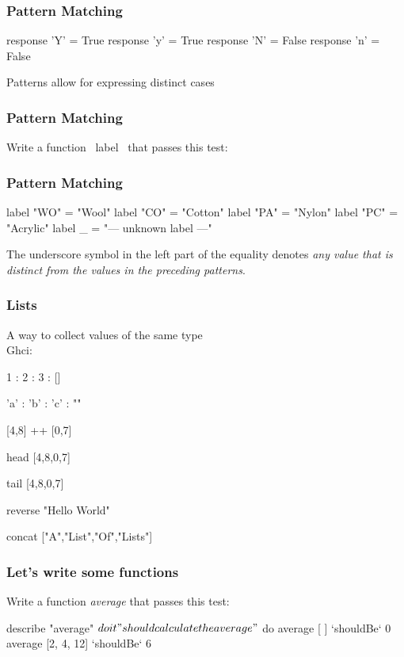\documentclass[11pt,xcolor={dvipsnames}]{beamer}
\newcommand{\tc}{\textcolor}
\newcommand{\key}[1]{\tc{orange}{#1}}
\newcommand{\rk}{\enskip{\key{$\hookleftarrow$}}}
\newcommand{\vs}{\vspace{1em}}
\begin{document}
\begin{frame}[fragile]
\frametitle{Pattern Matching}
\begin{haskell}
response 'Y' = True
response 'y' = True
response 'N' = False
response 'n' = False
\end{haskell}
\vs
Patterns allow for expressing distinct cases 
\end{frame}
\begin{frame}[fragile]
\frametitle{Pattern Matching}
Write a function ~label~ that passes this test:
\end{frame}
\begin{frame}[fragile]
\frametitle{Pattern Matching}
\begin{haskell}
label "WO" = "Wool"
label "CO" = "Cotton"
label "PA" = "Nylon"
label "PC" = "Acrylic"
label   _  = "--- unknown label ---"
\end{haskell}
The underscore symbol in the left part of the equality denotes \emph{any value that is distinct from the values in the preceding patterns}.
\end{frame}
\begin{frame}[fragile]
\frametitle{Lists}
A way to collect values of the same type\\
Ghci:
\begin{term}
1 : 2 : 3 : []\rk

'a' : 'b' : 'c' : ""\rk

[4,8] ++ [0,7]\rk

head [4,8,0,7]\rk

tail [4,8,0,7]\rk

reverse "Hello World"\rk

concat ["A","List","Of","Lists"]\rk
\end{term}
\end{frame}
\begin{frame}[fragile]
\frametitle{Let's write some functions}
Write a function \emph{average} that passes this test:
\vs
\begin{hspec}
    describe "average" $ do
        it "should calculate the average" $ do
            average [ ]        `shouldBe` 0
            average [2, 4, 12] `shouldBe` 6
\end{hspec}
\end{frame}
\end{document}
